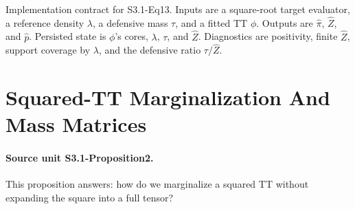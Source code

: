\documentclass[11pt]{article}
\begin{document}
\begin{center}
\end{center}

Implementation contract for S3.1-Eq13.  Inputs are a square-root target
evaluator, a reference density \(\lambda\), a defensive mass \(\tau\), and a
fitted TT \(\phi\).  Outputs are \(\widehat\pi\), \(\widehat Z\), and
\(\widehat p\).  Persisted state is \(\phi\)'s cores, \(\lambda\), \(\tau\),
and \(\widehat Z\).  Diagnostics are positivity, finite \(\widehat Z\), support
coverage by \(\lambda\), and the defensive ratio \(\tau/\widehat Z\).

\section{Squared-TT Marginalization And Mass Matrices}

\paragraph{Source unit S3.1-Proposition2.}
This proposition answers: how do we marginalize a squared TT without expanding
the square into a full tensor?
\end{document}
